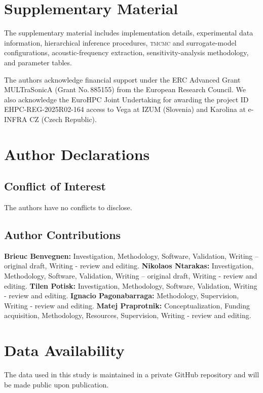 \documentclass[%
 aip,
 jcp,
 amsmath,amssymb,
 preprint,%
]{revtex4-1}
\begin{document}
\section*{Supplementary Material}
The supplementary material includes implementation details, experimental data information, hierarchical inference procedures, \textsc{tmcmc} and surrogate-model configurations, acoustic-frequency extraction, sensitivity-analysis methodology, and parameter tables.

\begin{acknowledgments}
The authors acknowledge financial support under the ERC Advanced Grant MULTraSonicA (Grant No.\,885155) from the European Research Council. We also acknowledge the EuroHPC Joint Undertaking for awarding the project ID EHPC-REG-2025R02-164 access to Vega at IZUM (Slovenia) and Karolina at e-INFRA CZ (Czech Republic). 
\end{acknowledgments}

\section*{Author Declarations}

\subsection*{Conflict of Interest}
The authors have no conflicts to disclose.

\subsection*{Author Contributions}

\textbf{Brieuc Benvegnen:} Investigation, Methodology, Software, Validation, Writing – original draft, Writing - review and editing.
\textbf{Nikolaos Ntarakas:} Investigation, Methodology, Software, Validation, Writing – original draft, Writing - review and editing.
\textbf{Tilen Potisk:} Investigation, Methodology, Software, Validation, Writing - review and editing.
\textbf{Ignacio Pagonabarraga:} Methodology, Supervision, Writing - review and editing.
\textbf{Matej Praprotnik:} Conceptualization, Funding acquisition, Methodology, Resources, Supervision, Writing - review and editing.



\section*{Data Availability}
The data used in this study is maintained in a private GitHub repository and will be made public upon publication.


\end{document}
